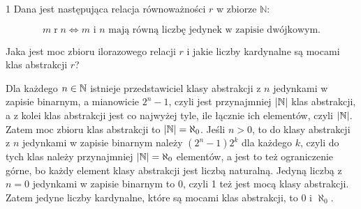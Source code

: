 \documentclass{../note}
\begin{document}
\begin{zadanie}{1}
Dana jest następująca relacja równoważności $r$ w zbiorze $\mathbb{N}$:

$$ m \mathrel{r} n \iff m \text{ i } n \text{ mają równą liczbę jedynek w zapisie dwójkowym.} $$

Jaka jest moc zbioru ilorazowego relacji $r$ i jakie liczby kardynalne są mocami klas abstrakcji $r$?
\end{zadanie}
\begin{rozwiazanie}
Dla każdego $n \in \mathbb{N}$ istnieje przedstawiciel klasy abstrakcji z $n$ jedynkami w zapisie binarnym, a mianowicie $2^n-1$, czyli jest przynajmniej $|\mathbb{N}|$ klas abstrakcji, a z kolei klas abstrakcji jest co najwyżej tyle, ile łącznie ich elementów, czyli $|\mathbb{N}|$. Zatem moc zbioru klas abstrakcji to $|\mathbb{N}|=\aleph_0$. Jeśli $n > 0$, to do klasy abstrakcji z $n$ jedynkami w zapisie binarnym należy $(2^n-1)2^k$ dla każdego $k$, czyli do tych klas należy przynajmniej $|\mathbb{N}| = \aleph_0$ elementów, a jest to też ograniczenie górne, bo każdy element klasy abstrakcji jest liczbą naturalną. Jedyną liczbą z $n=0$ jedynkami w zapisie binarnym to 0, czyli 1 też jest mocą klasy abstrakcji. Zatem jedyne liczby kardynalne, które są mocami klas abstrakcji, to 0 i $\aleph_0$.
\end{rozwiazanie}
\end{document}
